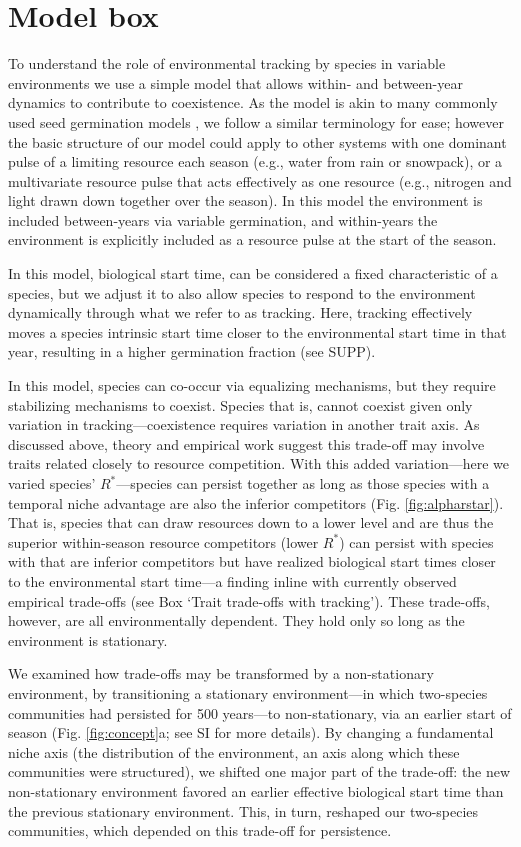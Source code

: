 \documentclass[11pt,letterpaper]{article}
\begin{document}
\section{Model box} %
To understand the role of environmental tracking by species in variable environments we use a simple model that allows within- and between-year dynamics to contribute to coexistence. As the model is akin to many commonly used seed germination models \citep{Chesson:2004eo}, we follow a similar terminology for ease; however the basic structure of our model could apply to other systems with one dominant pulse of a limiting resource each season (e.g., water from rain or snowpack), or a multivariate resource pulse that acts effectively as one resource (e.g., nitrogen and light drawn down together over the season). In this model the environment is included between-years via variable germination, and within-years the environment is explicitly included as a resource pulse at the start of the season. 

In this model, biological start time, can be considered a fixed characteristic of a species, but we adjust it to also allow species to respond to the environment dynamically through what we refer to as tracking. Here, tracking effectively moves a species intrinsic start time closer to the environmental start time in that year, resulting in a higher germination fraction (see SUPP).

In this model, species can co-occur via equalizing mechanisms, but they require stabilizing mechanisms to coexist. Species that is, cannot coexist given only variation in tracking---coexistence requires variation in another trait axis. As discussed above, theory and empirical work suggest this trade-off may involve traits related closely to resource competition. With this added variation---here we varied species' $R^*$---species can persist together as long as those species with a temporal niche advantage are also the inferior competitors (Fig. \ref{fig:alpharstar}). That is, species that can draw resources down to a lower level and are thus the superior within-season resource competitors (lower $R^*$) can persist with species with that are inferior competitors but have realized biological start times closer to the environmental start time---a finding inline with currently observed empirical trade-offs (see Box `Trait trade-offs with tracking'). These trade-offs, however, are all environmentally dependent. They hold only so long as the environment is stationary. 

We examined how trade-offs may be transformed by a non-stationary environment, by transitioning a stationary environment---in which two-species communities had persisted for 500 years---to non-stationary, via an earlier start of season (Fig. \ref {fig:concept}a; see SI for more details). By changing a fundamental niche axis (the distribution of the environment, an axis along which these communities were structured), we shifted one major part of the trade-off: the new non-stationary environment favored an earlier effective biological start time than the previous stationary environment. This, in turn, reshaped our two-species communities, which depended on this trade-off for persistence. 
\end{document}
